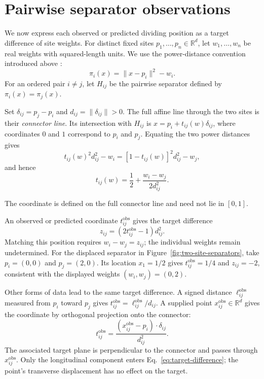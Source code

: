 \section{Pairwise separator observations}

We now express each observed or predicted dividing position as a target difference of site weights. For distinct fixed sites $p_1,\ldots,p_n\in\mathbb R^d$, let $w_1,\ldots,w_n$ be real weights with squared-length units. We use the power-distance convention introduced above \citep{Aurenhammer1987}:
\begin{equation}
\pi_i(x)=\|x-p_i\|^2-w_i.
\end{equation}
For an ordered pair $i\ne j$, let $H_{ij}$ be the pairwise separator defined by $\pi_i(x)=\pi_j(x)$.

\begin{samepage}
Set $\delta_{ij}=p_j-p_i$ and $d_{ij}=\|\delta_{ij}\|>0$. The full affine line through the two sites is their \emph{connector line}. Its intersection with $H_{ij}$ is $x=p_i+t_{ij}(w)\delta_{ij}$, where coordinates $0$ and $1$ correspond to $p_i$ and $p_j$. Equating the two power distances gives
\begin{equation*}
 t_{ij}(w)^2d_{ij}^2-w_i=[1-t_{ij}(w)]^2d_{ij}^2-w_j,
\end{equation*}
and hence
\begin{equation}
\boxed{t_{ij}(w)=\frac12+\frac{w_i-w_j}{2d_{ij}^2}.}
\label{eq:pair-coordinate}
\end{equation}
\end{samepage}
The coordinate is defined on the full connector line and need not lie in $[0,1]$.

An observed or predicted coordinate $t_{ij}^{\mathrm{obs}}$ gives the target difference
\begin{equation}
 z_{ij}=(2t_{ij}^{\mathrm{obs}}-1)d_{ij}^2.
 \label{eq:target-difference}
\end{equation}
Matching this position requires $w_i-w_j=z_{ij}$; the individual weights remain undetermined. For the displaced separator in Figure~\ref{fig:two-site-separators}, take $p_i=(0,0)$ and $p_j=(2,0)$. Its location $x_1=1/2$ gives $t_{ij}^{\mathrm{obs}}=1/4$ and $z_{ij}=-2$, consistent with the displayed weights $(w_i,w_j)=(0,2)$.

Other forms of data lead to the same target difference. A signed distance $\ell_{ij}^{\mathrm{obs}}$ measured from $p_i$ toward $p_j$ gives $t_{ij}^{\mathrm{obs}}=\ell_{ij}^{\mathrm{obs}}/d_{ij}$. A supplied point $x_{ij}^{\mathrm{obs}}\in\mathbb R^d$ gives the coordinate by orthogonal projection onto the connector:
\begin{equation}
 t_{ij}^{\mathrm{obs}}=\frac{(x_{ij}^{\mathrm{obs}}-p_i)\cdot\delta_{ij}}{d_{ij}^2}.
\end{equation}
The associated target plane is perpendicular to the connector and passes through $x_{ij}^{\mathrm{obs}}$. Only the longitudinal component enters Eq.~\eqref{eq:target-difference}; the point's transverse displacement has no effect on the target.


